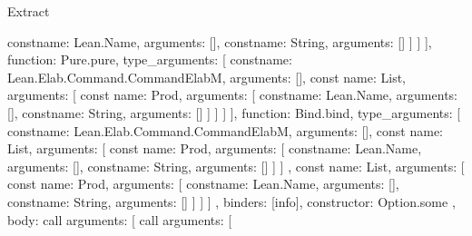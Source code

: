 \begin{lexlean}{Extract}
\begin{toolingmodule}
{{{{{{{{{{{{                                      const{name: Lean.Name, arguments: []},
                                      const{name: String, arguments: []}
                                    ]
                                  }
                                ]
                              }
                            ],
                            function: Pure.pure,
                            type_arguments: [
                              const{name: Lean.Elab.Command.CommandElabM, arguments: []},
                              const{
                                name: List,
                                arguments: [
                                  const{
                                    name: Prod,
                                    arguments: [
                                      const{name: Lean.Name, arguments: []},
                                      const{name: String, arguments: []}
                                    ]
                                  }
                                ]
                              }
                            ]
                          }
                        }
                      ],
                      function: Bind.bind,
                      type_arguments: [
                        const{name: Lean.Elab.Command.CommandElabM, arguments: []},
                        const{
                          name: List,
                          arguments: [
                            const{
                              name: Prod,
                              arguments: [
                                const{name: Lean.Name, arguments: []},
                                const{name: String, arguments: []}
                              ]
                            }
                          ]
                        },
                        const{
                          name: List,
                          arguments: [
                            const{
                              name: Prod,
                              arguments: [
                                const{name: Lean.Name, arguments: []},
                                const{name: String, arguments: []}
                              ]
                            }
                          ]
                        }
                      ]
                    },
                    binders: [info],
                    constructor: Option.some
                  },
                  {
                    body: call{
                      arguments: [
                        call{
                          arguments: [
}}}}}}}}}
\end{toolingmodule}
\end{lexlean}
